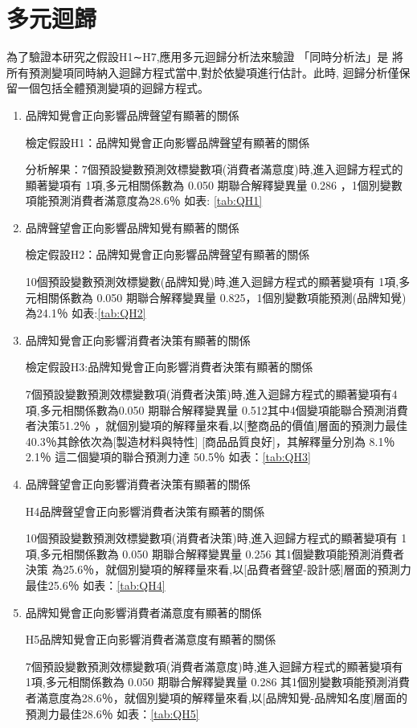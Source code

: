 \section{多元迴歸}
為了驗證本研究之假設H1∼H7,應用多元迴歸分析法來驗證 「同時分析法」是 將所有預測變項同時納入迴歸方程式當中,對於依變項進行估計。此時, 迴歸分析僅保留一個包括全體預測變項的迴歸方程式。

\begin{enumerate}
\item 品牌知覺會正向影響品牌聲望有顯著的關係

檢定假設H1：品牌知覺會正向影響品牌聲望有顯著的關係

分析解果：7個預設變數預測效標變數項(消費者滿意度)時,進入迴歸方程式的顯著變項有 1項,多元相關係數為 0.050 期聯合解釋變異量 0.286 ，1個別變數項能預測消費者滿意度為28.6％ 如表: \ref{tab:QH1}
\item 品牌聲望會正向影響品牌知覺有顯著的關係

檢定假設H2：品牌知覺會正向影響品牌聲望有顯著的關係

10個預設變數預測效標變數(品牌知覺)時,進入迴歸方程式的顯著變項有 1項,多元相關係數為 0.050 期聯合解釋變異量 0.825，1個別變數項能預測(品牌知覺)為24.1％ 如表:\ref{tab:QH2}

\item 品牌知覺會正向影響消費者決策有顯著的關係

檢定假設H3:品牌知覺會正向影響消費者決策有顯著的關係

7個預設變數預測效標變數項(消費者決策)時,進入迴歸方程式的顯著變項有4項,多元相關係數為0.050 期聯合解釋變異量 0.512其中4個變項能聯合預測消費者決策51.2％ ，就個別變項的解釋量來看,以[整商品的價值]層面的預測力最佳40.3％其餘依次為[製造材料與特性] [商品品質良好]，其解釋量分別為 8.1％ 2.1％  這二個變項的聯合預測力達 50.5％ 如表：\ref{tab:QH3}

\item 品牌聲望會正向影響消費者決策有顯著的關係

H4品牌聲望會正向影響消費者決策有顯著的關係

10個預設變數預測效標變數項(消費者決策)時,進入迴歸方程式的顯著變項有 1項,多元相關係數為 0.050 期聯合解釋變異量 0.256 其1個變數項能預測消費者決策 為25.6％，就個別變項的解釋量來看,以[品費者聲望-設計感]層面的預測力最佳25.6％ 如表：\ref{tab:QH4}

\item 品牌知覺會正向影響消費者滿意度有顯著的關係

H5品牌知覺會正向影響消費者滿意度有顯著的關係

7個預設變數預測效標變數項(消費者滿意度)時,進入迴歸方程式的顯著變項有 1項,多元相關係數為 0.050 期聯合解釋變異量 0.286 其1個別變數項能預測消費者滿意度為28.6％，就個別變項的解釋量來看,以[品牌知覺-品牌知名度]層面的預測力最佳28.6％ 如表：\ref{tab:QH5}


\end{enumerate}
